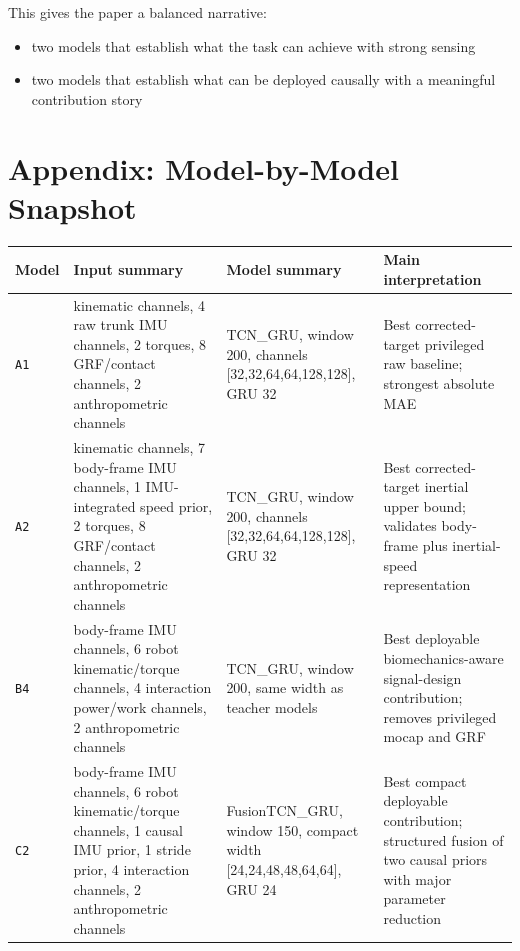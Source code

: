 \documentclass[11pt,a4paper]{article}
\begin{document}
This gives the paper a balanced narrative:
\begin{itemize}
\item two models that establish what the task can achieve with strong sensing
\item two models that establish what can be deployed causally with a meaningful contribution story
\end{itemize}

\section*{Appendix: Model-by-Model Snapshot}

\small
\begin{longtable}{>{\raggedright\arraybackslash}p{1.3cm} >{\raggedright\arraybackslash}p{4.2cm} >{\raggedright\arraybackslash}p{3.7cm} >{\raggedright\arraybackslash}p{4.0cm}}
\toprule
Model & Input summary & Model summary & Main interpretation \\
\midrule
\endhead

\texttt{A1} &
18 kinematic channels, 4 raw trunk IMU channels, 2 torques, 8 GRF/contact channels, 2 anthropometric channels &
TCN\_GRU, window 200, channels [32,32,64,64,128,128], GRU 32 &
Best corrected-target privileged raw baseline; strongest absolute MAE \\

\texttt{A2} &
18 kinematic channels, 7 body-frame IMU channels, 1 IMU-integrated speed prior, 2 torques, 8 GRF/contact channels, 2 anthropometric channels &
TCN\_GRU, window 200, channels [32,32,64,64,128,128], GRU 32 &
Best corrected-target inertial upper bound; validates body-frame plus inertial-speed representation \\

\texttt{B4} &
7 body-frame IMU channels, 6 robot kinematic/torque channels, 4 interaction power/work channels, 2 anthropometric channels &
TCN\_GRU, window 200, same width as teacher models &
Best deployable biomechanics-aware signal-design contribution; removes privileged mocap and GRF \\

\texttt{C2} &
7 body-frame IMU channels, 6 robot kinematic/torque channels, 1 causal IMU prior, 1 stride prior, 4 interaction channels, 2 anthropometric channels &
FusionTCN\_GRU, window 150, compact width [24,24,48,48,64,64], GRU 24 &
Best compact deployable contribution; structured fusion of two causal priors with major parameter reduction \\

\bottomrule
\end{longtable}
\end{document}

